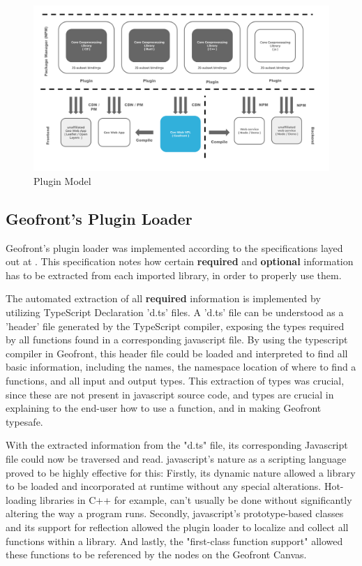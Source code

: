 \begin{figure}
  \centering
  \graphicspath{ {../../assets/diagrams/} }
  \includegraphics[width=\linewidth]{Model Proposal.png}
  \caption{Plugin Model}
  \label{fig:plugin-model}
\end{figure}

\subsection{Geofront's Plugin Loader}

Geofront's plugin loader was implemented according to the specifications layed out at .
This specification notes how certain \textbf{required} and \textbf{optional} information has to be extracted from each imported library, in order to properly use them. 

The automated extraction of all \textbf{required} information is implemented by utilizing TypeScript Declaration 'd.ts' files. 
A 'd.ts' file can be understood as a 'header' file generated by the TypeScript compiler, exposing the types required by all functions found in a corresponding javascript file.
By using the typescript compiler in Geofront, this header file could be loaded and interpreted to find all basic information, including the names, the namespace location of where to find a functions, and all input and output types.
This extraction of types was crucial, since these are not present in javascript source code, and types are crucial in explaining to the end-user how to use a function, and in making Geofront typesafe.

With the extracted information from the "d.ts" file, its corresponding Javascript file could now be traversed and read.
javascript's nature as a scripting language proved to be highly effective for this:
Firstly, its dynamic nature allowed a library to be loaded and incorporated at runtime without any special alterations. 
Hot-loading libraries in C++ for example, can't usually be done without significantly altering the way a program runs. 
Secondly, javascript's prototype-based classes and its support for reflection allowed the plugin loader to localize and collect all functions within a library.
And lastly, the "first-class function support" allowed these functions to be referenced by the nodes on the Geofront Canvas. 

